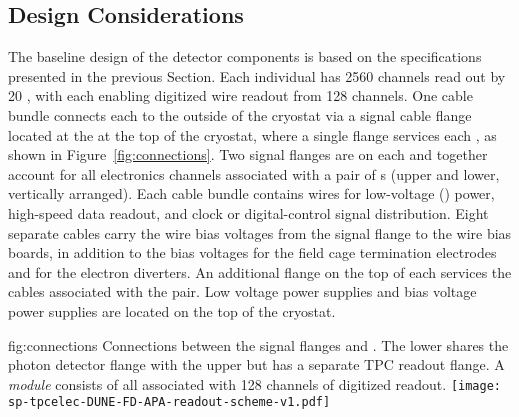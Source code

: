 \subsection{Design Considerations}
\label{sec:fdsp-tpcelec-overview-design}

The baseline design of the  detector components is
based on the specifications presented in the previous Section.
Each individual  has \num{2560} channels read out by \num{20} 
, with each  enabling digitized wire readout 
from \num{128} channels. One cable bundle connects each  to
the outside of the cryostat via a  signal cable flange located 
at the  \fdth at the top of the cryostat, where a single flange 
services each , as shown in Figure~\ref{fig:connections}. 
Two  signal flanges are on each \fdth and together account for 
all electronics channels associated with a pair of s (upper 
and lower, vertically arranged). Each cable bundle contains wires for 
low-voltage () power, high-speed data readout, and clock or 
digital-control signal distribution. Eight separate cables carry the 
 wire bias voltages from the signal flange to the  
wire bias boards, in addition to the bias voltages for the field cage 
termination electrodes and for the electron diverters. An additional 
flange on the top of each \fdth services the  cables associated 
with the  pair. Low voltage power supplies and bias voltage
power supplies are located on the top of the cryostat. 

\begin{dunefigure}
{fig:connections}
{Connections between the signal flanges and . The lower 
 shares the photon detector flange with the 
upper  but has a separate TPC readout flange. 
A \textit{ module} consists of all  
associated with \num{128} channels of digitized readout.}
\texttt{[image: sp-tpcelec-DUNE-FD-APA-readout-scheme-v1.pdf]}
\end{dunefigure}

